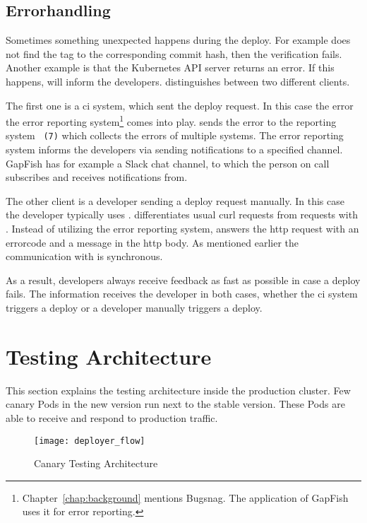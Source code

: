 \subsection{Errorhandling}

Sometimes something unexpected happens during the deploy. For example \deployer{} does not
find the tag to the corresponding commit hash, then the verification fails. Another
example is that the Kubernetes API server returns an error. If this happens, \deployer{} will
inform the developers. \deployer{} distinguishes between two different clients.

The first one is a \gls{ci} system, which sent the deploy request. In this case the error
the error reporting system\footnote{Chapter~\ref{chap:background} mentions Bugsnag. The
  application of GapFish uses it for error reporting.} comes into play. \deployer{} sends the
error to the reporting system ~\texttt{(7)} which collects the errors of multiple
systems. The error reporting system informs the developers via sending notifications to a
specified channel. GapFish has for example a Slack chat channel, to which the person on
call subscribes and receives notifications from.

The other client is a developer sending a deploy request manually. In this case the
developer typically uses \depctl{}. \deployer{} differentiates usual curl requests from
requests with \depctl{}. Instead of utilizing the error reporting system, \deployer{} answers
the \gls{http} request with an errorcode and a message in the \gls{http} body. As mentioned earlier
the communication with \deployer{} is synchronous.

As a result, developers always receive feedback as fast as possible in case a deploy
fails. The information receives the developer in both cases, whether the \gls{ci} system
triggers a deploy or a developer manually triggers a deploy.

\section{Testing Architecture}
\label{test_architecture}

This section explains the testing architecture inside the production cluster. Few canary
Pods in the new version run next to the stable version. These Pods are able to receive and
respond to production traffic.

\begin{figure}[htbp] \centering \texttt{[image: deployer\_flow]}
  \caption{Canary Testing Architecture}
  \label{fig:testing_flow}
\end{figure}



